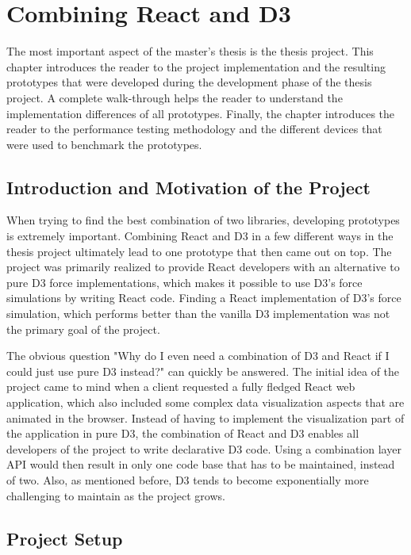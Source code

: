 \chapter{Combining React and D3}
\label{cha:visualization}

The most important aspect of the master's thesis is the thesis project. This chapter introduces the reader to the project implementation and the resulting prototypes that were developed during the development phase of the thesis project. A complete walk-through helps the reader to understand the implementation differences of all prototypes. Finally, the chapter introduces the reader to the performance testing methodology and the different devices that were used to benchmark the prototypes.

\section{Introduction and Motivation of the Project}

When trying to find the best combination of two libraries, developing prototypes is extremely important. Combining React and D3 in a few different ways in the thesis project ultimately lead to one prototype that then came out on top. The project was primarily realized to provide React developers with an alternative to pure D3 force implementations, which makes it possible to use D3's force simulations by writing React code. Finding a React implementation of D3's force simulation, which performs better than the vanilla D3 implementation was not the primary goal of the project.

The obvious question "Why do I even need a combination of D3 and React if I could just use pure D3 instead?" can quickly be answered. The initial idea of the project came to mind when a client requested a fully fledged React web application, which also included some complex data visualization aspects that are animated in the browser. Instead of having to implement the visualization part of the application in pure D3, the combination of React and D3 enables all developers of the project to write declarative D3 code. Using a combination layer API would then result in only one code base that has to be maintained, instead of two. Also, as mentioned before, D3 tends to become exponentially more challenging to maintain as the project grows.

\section{Project Setup}
\label{sub:projectSetup}

